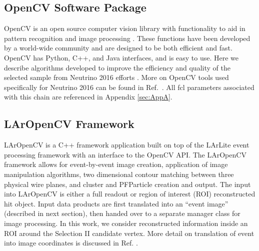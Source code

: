 \documentclass{article}
\begin{document}
\subsection{OpenCV Software Package}
OpenCV is an open source computer vision library with functionality to aid in pattern recognition and image processing \cite{bib:opencv}. These functions have been developed by a world-wide community and are designed to be both efficient and fast. OpenCV has Python, C++, and Java interfaces, and is easy to use. Here we describe algorithms developed to improve the efficiency and quality of the selected sample from Neutrino 2016 efforts \cite{bib:5864}. More on OpenCV tools used specifically for Neutrino 2016 can be found in Ref.~\cite{bib:5856}.  All fcl parameters associated with this chain are referenced in Appendix \ref{sec:AppA}.

\subsection{LArOpenCV Framework}
LArOpenCV is a C++ framework application built on top of the LArLite event processing framework with an interface to the OpenCV API. The LArOpenCV framework allows for event-by-event image creation, application of image manipulation algorithms, two dimensional contour matching between three physical wire planes, and cluster and PFParticle creation and output. The input into LArOpenCV is either a full readout or region of interest (ROI) reconstructed hit object. Input data products are first translated into an ``event image'' (described in next section), then handed over to a separate manager class for image processing. In this work, we consider reconstructed information inside an ROI around the Selection II candidate vertex.  More detail on translation of event into image coordinates is discussed in Ref. \cite{bib:5856}.
\end{document}
